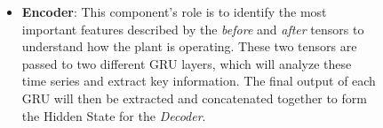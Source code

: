 \begin{figure}[H]
\begin{minipage}{0.6\textwidth}
\begin{itemize}
			\item \textbf{Encoder}: This component's role is to identify the most important features described by the \textit{before} and \textit{after} tensors to understand how the plant is operating. These two tensors are passed to two different GRU layers, which will analyze these time series and extract key information. The final output of each GRU will then be extracted and concatenated together to form the Hidden State for the \textit{Decoder}.
		\end{itemize}
	\end{minipage}%
	\hspace{0.5cm}
	\begin{minipage}{0.4\textwidth}
		\centering

\end{minipage}
\end{figure}
